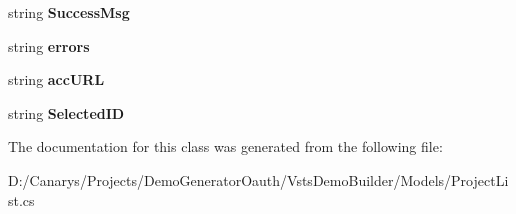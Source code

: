\begin{DoxyCompactItemize}
string {\bfseries Success\+Msg}
\item 
\mbox{\label{class_vsts_demo_builder_1_1_models_1_1_project_list_1_1_authentication_a530413b0ce6aab641d523ba202b2830a}} 
string {\bfseries errors}
\item 
\mbox{\label{class_vsts_demo_builder_1_1_models_1_1_project_list_1_1_authentication_a60dba0f9d005888ac332814acbbfaa97}} 
string {\bfseries acc\+U\+RL}
\item 
\mbox{\label{class_vsts_demo_builder_1_1_models_1_1_project_list_1_1_authentication_a0f846cdcd43a89ff84fd3616c9d73de3}} 
string {\bfseries Selected\+ID}
\end{DoxyCompactItemize}


The documentation for this class was generated from the following file\+:\begin{DoxyCompactItemize}
\item 
D\+:/\+Canarys/\+Projects/\+Demo\+Generator\+Oauth/\+Vsts\+Demo\+Builder/\+Models/Project\+List.\+cs\end{DoxyCompactItemize}
